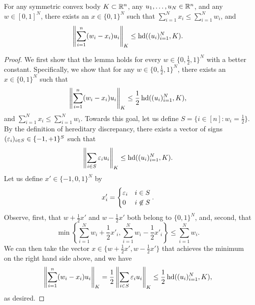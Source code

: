 \begin{lemma}\label{lm:ac-to-herdisc}
  For any symmetric convex body $K \subset{\mathbb{R}}^n$, any $u_1, \ldots, u_N
  \in {\mathbb{R}}^n$, and any $w \in [0,1]^N$, there exists an $x\in \{0,1\}^N$
  such that $\sum_{i = 1}^N{x_i} \le \sum_{i = 1}^N{w_i}$, and
  \[
  \left\|\sum_{i = 1}^n(w_i - x_i)u_i\right\|_K \le \operatorname{hd}((u_i)_{i =  1}^N, K).
  \]
\end{lemma}
\begin{proof}
  We first show that the lemma holds for every $w \in \{0, \frac12,
  1\}^N$ with a better constant. Specifically, we show that for any $w
  \in \{0, \frac12, 1\}^N$, there exists an $x \in \{0,1\}^N$ such that
  \[
  \left\|\sum_{i = 1}^n(w_i - x_i)u_i\right\|_K \le  \frac12 \operatorname{hd}((u_i)_{i =  1}^N, K),
  \]
  and $\sum_{i = 1}^N x_i \le \sum_{i = 1}^N{w_i}$. Towards this goal,
  let us define $S = \{i \in [n]: w_i = \frac12\}$. By the definition
  of hereditary discrepancy, there exists a vector of signs
  $(\varepsilon_i)_{i \in S} \in \{-1,+1\}^S$ such that 
  \[
  \left\|\sum_{i \in S}{\varepsilon_i u_i}\right\|_K   \le \operatorname{hd}((u_i)_{i = 1}^N,  K).
  \] 
  Let us define $x' \in \{-1, 0,   1\}^N$ by 
  \[
  x'_i =
  \begin{cases}
    \varepsilon_i &i \in S\\
    0 &i \not \in S
  \end{cases}.
  \]
  Observe, first, that $w+\frac12 x'$ and $w-\frac12 x'$ both belong to $\{0,1\}^N$,
  and, second, that 
  \[
  \min\left\{\sum_{i = 1}^N{w_i+\frac12 x'_i}, \sum_{i = 1}^N{w_i-\frac12 x'_i}\right\}
  \le \sum_{i = 1}^N{w_i}.
  \]
  We can then take the vector $x \in \{w + \frac12 x', w-\frac12 x'\}$ that achieves the minimum
  on the right hand side above, and we have
  \[
  \left\|\sum_{i = 1}^n(w_i - x_i)u_i\right\|_K 
  =\frac12  \left\|\sum_{i \in S}{\varepsilon_i u_i}\right\|_K 
  \le  \frac12 \operatorname{hd}((u_i)_{i =  1}^N, K),
  \]
  as desired.


\end{proof}
